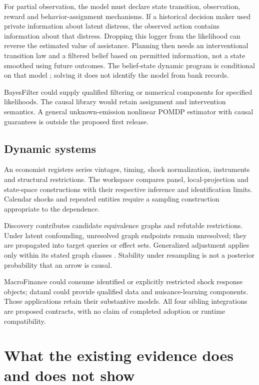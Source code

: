\documentclass[11pt,a4paper,openany]{book}
\begin{document}
For partial observation, the model must declare state transition,
observation, reward and behavior-assignment mechanisms. If a historical
decision maker used private information about latent distress, the observed
action contains information about that distress. Dropping this logger from
the likelihood can reverse the estimated value of assistance. Planning
then needs an interventional transition law and a filtered belief based on
permitted information, not a state smoothed using future outcomes.
The belief-state dynamic program is conditional on that model
\citep{kaelbling1998}; solving it does not identify the model from bank records.

BayesFilter could supply qualified filtering or numerical components for
specified likelihoods. The causal library would retain assignment and
intervention semantics. A general unknown-emission nonlinear POMDP estimator
with causal guarantees is outside the proposed first release.

\section{Dynamic systems}

An economist registers series vintages, timing, shock normalization,
instruments and structural restrictions. The workspace compares
panel, local-projection and state-space constructions with their respective
inference and identification limits. Calendar shocks and repeated entities
require a sampling construction appropriate to the dependence.

Discovery contributes candidate equivalence graphs and refutable
restrictions. Under latent confounding, unresolved graph endpoints remain
unresolved; they are propagated into target queries or effect sets.
Generalized adjustment applies only within its stated graph classes
\citep{perkovic2018}. Stability under resampling is not a posterior probability
that an arrow is causal.

MacroFinance could consume identified or explicitly restricted shock
response objects; dataml could provide qualified data and nuisance-learning
components. Those applications retain their substantive models. All four
sibling integrations are proposed contracts, with no claim of completed
adoption or runtime compatibility.

\chapter{What the existing evidence does and does not show}
\end{document}
